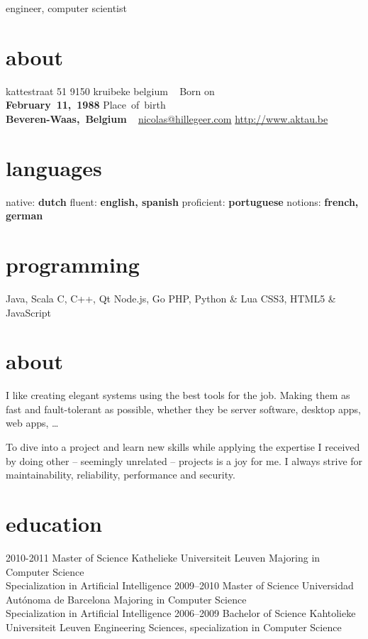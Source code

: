 \documentclass[]{friggeri-cv}
\begin{document}
       {engineer, computer scientist}


\begin{aside}
  \section{about}
    kattestraat 51
    9150 kruibeke
    belgium
    ~
    Born on\\\textbf{February~11,~1988}
    Place~of~birth\\\textbf{Beveren-Waas,~Belgium}
    ~
    \href{mailto:nicolas@hillegeer.com}{nicolas@hillegeer.com}
    \href{http://www.aktau.be}{http://www.aktau.be}
  \section{languages}
    native: \textbf{dutch}
    fluent: \textbf{english, spanish}
    proficient: \textbf{portuguese}
    notions: \textbf{french, german}
  \section{programming}
    Java, Scala
    C, C++, Qt
    Node.js, Go
    PHP, Python \& Lua
    CSS3, HTML5 \& JavaScript
\end{aside}

\section{about}

I like creating elegant systems using the best tools for the job. Making them as fast and fault-tolerant as possible,
whether they be server software, desktop apps, web apps, \ldots

To dive into a project and learn new skills while applying the expertise I received by doing other -- seemingly unrelated -- projects
is a joy for me. I always strive for maintainability, reliability, performance and security.

\section{education}

\begin{entrylist}
  \entry
    {2010-2011}
    {Master of Science}
    {Kathelieke Universiteit Leuven}
    {Majoring in Computer Science\\
    Specialization in Artificial Intelligence}
  \entry
    {2009–2010}
    {Master of Science}
    {Universidad Autónoma de Barcelona}
    {Majoring in Computer Science\\
    Specialization in Artificial Intelligence}
  \entry
    {2006–2009}
    {Bachelor of Science}
    {Kahtolieke Universiteit Leuven}
    {Engineering Sciences, specialization in Computer Science}
\end{entrylist}
\end{document}
